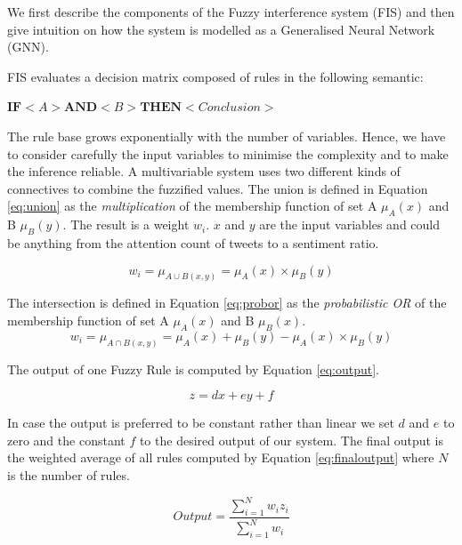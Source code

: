 We first describe the components of the Fuzzy interference system (FIS) and then give intuition on how the system is modelled as a Generalised Neural Network (GNN). 

FIS evaluates a decision matrix composed of rules in the following semantic: \\

\centerline {$ \textbf{IF} <  A  > \textbf{AND} <  B  > \textbf{THEN} < Conclusion > $}

The rule base grows exponentially with the number of variables. Hence, we have to consider carefully the input variables to minimise the complexity and to make the inference reliable. A multivariable system uses two different kinds of connectives to combine the fuzzified values. The union is defined in Equation \ref{eq:union} as the \emph{multiplication} of the membership function of set A $\mu_A(x)$ and B $\mu_B(y).$ The result is a weight $w_i$. $x$ and $y$ are the input variables and could be anything from the attention count of tweets to a sentiment ratio. 


 \begin{equation} \label{eq:union}
 w_i =  \mu_{A\cup B(x,y)} =   \mu_A (x) \times \mu_B(y)
 \end{equation}

The intersection is defined in Equation \ref{eq:probor} as the \emph{probabilistic OR} of the membership function of set A $\mu_A(x)$ and B $\mu_B(x).$ 
\begin{equation} \label{eq:probor}
 w_i =  \mu_{A\cap B(x,y)} =   \mu_A (x)  + \mu_B(y) -  \mu_A (x)  \times \mu_B(y)
 \end{equation}

The output of one Fuzzy Rule is computed by Equation \ref{eq:output}.


\begin{equation} \label{eq:output}
 z = dx + ey + f  \end{equation}
 
In case the output is preferred to be constant rather than linear we set $d$ and $e$ to zero and the constant  $f$ to the desired output of our system. The final output is the weighted average of all rules computed by Equation \ref{eq:finaloutput} where $N$ is the number of rules.

\begin{equation} \label{eq:finaloutput}
Output = \frac { \sum\limits_{i=1}^N  w_i z_i} {\sum\limits_{i=1}^N  w_i } \end{equation}



